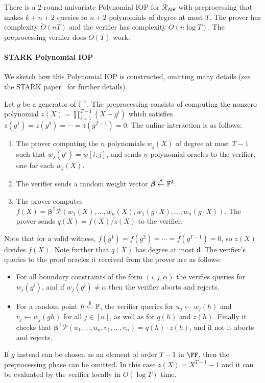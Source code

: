 \begin{theorem}
There is a 2-round univariate Polynomial IOP for $\mathcal{R}_\mathsf{AIR}$ with preprocessing that makes $k+n+2$ queries to $n+2$ polynomials of degree at most $T$. The prover has complexity $\tilde{O}(nT)$ and the verifier has complexity $O(n \log T)$. The preprocessing verifier does $O(T)$ work.
\end{theorem}


\paragraph{\textsf{STARK} Polynomial IOP} We sketch how this Polynomial IOP is constructed, omitting many details (see the \textsf{STARK} paper~\cite{C:BBHR19} for further details).

Let $g$ be a generator of $\mathbb{F}^\times$. The preprocessing consists of computing the nonzero polynomial $z(X) = \prod_{i=1}^{T-1} (X-g^i)$ which satisfies $z(g^1) = z(g^2) = \cdots = z(g^{T-1}) = 0$. The online interaction is as follows: 
\begin{enumerate} 
\item The prover computing the $n$ polynomials $w_j(X)$ of degree at most $T-1$ such that $w_j(g^i) = w[i,j]$, and sends $n$ polynomial oracles to the verifier, one for each $w_j(X)$. 
\item The verifier sends a random weight vector $\boldsymbol{\beta} \overset{\$}{\gets} \mathbb{F}^k$.
\item  The prover computes $f(X) = \boldsymbol{\beta}^\mathsf{T} \boldsymbol{\mathcal{P}}(w_1(X), \ldots, w_n(X), w_1(g \cdot X), \ldots, w_n(g \cdot X))$. The prover sends $q(X) = f(X)/z(X)$ to the verifier.

\end{enumerate}

  Note that for a valid witness, $f(g^1) = f(g^2) = \cdots = f(g^{T-1}) = 0$, so $z(X)$ divides $f(X)$. Note further that $q(X)$ has degree at most $\mathsf{d}$. The verifier's queries to the proof oracles it received from the prover are as follows:
\begin{itemize}
    \item For all boundary constraints of the form $(i, j, \alpha)$ the verifies queries for $w_j(g^i)$, and if $w_j(g^i) \neq \alpha$ then the verifier aborts and rejects. %
    \item For a random point $h \overset{\$}{\gets} \mathbb{F}$, the verifier queries for $u_j \leftarrow w_j(h)$ and $v_j \leftarrow w_j(gh)$ for all $j \in [n]$, as well as for $q(h)$ and $z(h)$. %
    Finally it checks that $\boldsymbol{\beta}^\mathsf{T} \boldsymbol{\mathcal{P}}(u_1, \ldots, u_n, v_1, \ldots, v_n) = q(h) \cdot z(h)$, and if not it aborts and rejects.
\end{itemize}
If $g$ instead can be chosen as an element of order $T-1$ in $\FF$, then the preprocessing phase can be omitted. In this case $z(X) = X^{T-1} - 1$ and it can be evaluated by the verifier locally in $O(\log T)$ time.

